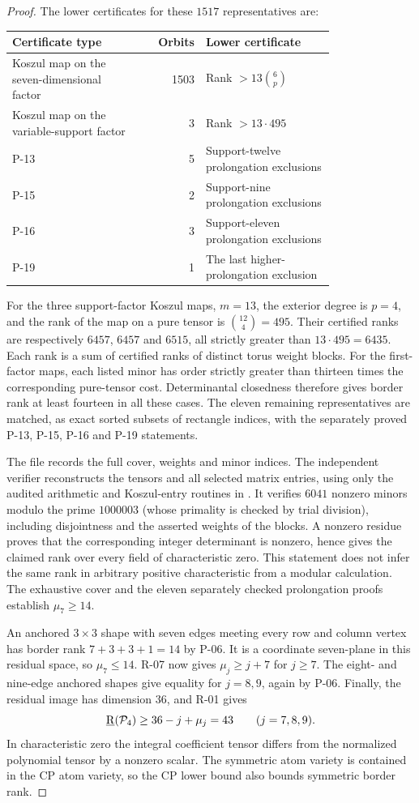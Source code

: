 \begin{proof}
The lower certificates for these $1517$ representatives are:
\begin{center}
\begin{tabular}{p{0.39\linewidth}|r|p{0.40\linewidth}}
Certificate type&Orbits&Lower certificate\\\hline
Koszul map on the seven-dimensional factor&1503&Rank $>13\binom6p$\\
Koszul map on the variable-support factor&3&Rank $>13\cdot495$\\
P-13&5&Support-twelve prolongation exclusions\\
P-15&2&Support-nine prolongation exclusions\\
P-16&3&Support-eleven prolongation exclusions\\
P-19&1&The last higher-prolongation exclusion
\end{tabular}
\end{center}
For the three support-factor Koszul maps, $m=13$, the exterior
degree is $p=4$, and the rank of the map on a pure tensor is
$\binom{12}{4}=495$. Their certified ranks are respectively
$6457$, $6457$ and $6515$, all strictly greater than
$13\cdot495=6435$. Each rank is a sum of certified ranks of
distinct torus weight blocks. For the first-factor maps, each
listed minor has order strictly greater than thirteen times
the corresponding pure-tensor cost. Determinantal closedness
therefore gives border rank at least fourteen in all these cases.
The eleven remaining representatives are matched, as exact
sorted subsets of rectangle indices, with the separately proved
P-13, P-15, P-16 and P-19 statements.

The file  records the full
cover, weights and minor indices. The independent verifier
 reconstructs the tensors and all
selected matrix entries, using only the audited arithmetic and
Koszul-entry routines in .
It verifies $6041$ nonzero minors modulo the prime $1000003$
(whose primality is checked by trial division), including
disjointness and the asserted weights of the blocks. A nonzero
residue proves that the corresponding integer determinant is
nonzero, hence gives the claimed rank over every field of
characteristic zero. This statement does not infer the same
rank in arbitrary positive characteristic from a modular
calculation. The exhaustive cover and the eleven separately
checked prolongation proofs establish $\mu_7\geq14$.

An anchored $3\times3$ shape with seven edges meeting every
row and column vertex has border rank $7+3+3+1=14$ by P-06.
It is a coordinate seven-plane in this residual space, so
$\mu_7\leq14$. R-07 now gives $\mu_j\geq j+7$ for $j\geq7$.
The eight- and nine-edge anchored shapes give equality for
$j=8,9$, again by P-06. Finally, the residual image has
dimension $36$, and R-01 gives
\[
 \underline{\mathrm R}(\mathcal P_4)\geq36-j+\mu_j=43\qquad(j=7,8,9).
\]
In characteristic zero the integral coefficient tensor differs
from the normalized polynomial tensor by a nonzero scalar.
The symmetric atom variety is contained in the CP atom variety,
so the CP lower bound also bounds symmetric border rank.
\end{proof}


